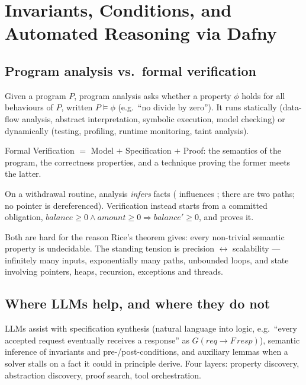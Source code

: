

\chapter{Invariants, Conditions, and Automated Reasoning via Dafny}

\section{Program analysis vs.\ formal verification}
Given a program $P$, program analysis asks whether a property $\phi$ holds for
all behaviours of $P$, written $P \models \phi$ (e.g.\ ``no divide by zero'').
It runs statically (data-flow analysis, abstract interpretation, symbolic
execution, model checking) or dynamically (testing, profiling, runtime
monitoring, taint analysis).

\begin{ppkey}
Formal Verification $=$ Model $+$ Specification $+$ Proof: the semantics of the
program, the correctness properties, and a technique proving the former meets
the latter.
\end{ppkey}

On a withdrawal routine, analysis \emph{infers} facts (
influences ; there are two paths; no pointer is dereferenced).
Verification instead starts from a committed obligation,
$\mathit{balance} \geq 0 \wedge \mathit{amount} \geq 0 \Rightarrow
\mathit{balance}' \geq 0$, and proves it.

\begin{ppnote}
Both are hard for the reason Rice's theorem gives: every non-trivial semantic
property is undecidable. The standing tension is precision $\leftrightarrow$
scalability --- infinitely many inputs, exponentially many paths, unbounded
loops, and state involving pointers, heaps, recursion, exceptions and threads.
\end{ppnote}

\section{Where LLMs help, and where they do not}
LLMs assist with specification synthesis (natural language into logic, e.g.\
``every accepted request eventually receives a response'' as
$G(\mathit{req} \rightarrow F\,\mathit{resp})$), semantic inference of
invariants and pre-/post-conditions, and auxiliary lemmas when a solver stalls
on a fact it could in principle derive. Four layers: property discovery,
abstraction discovery, proof search, tool orchestration.

